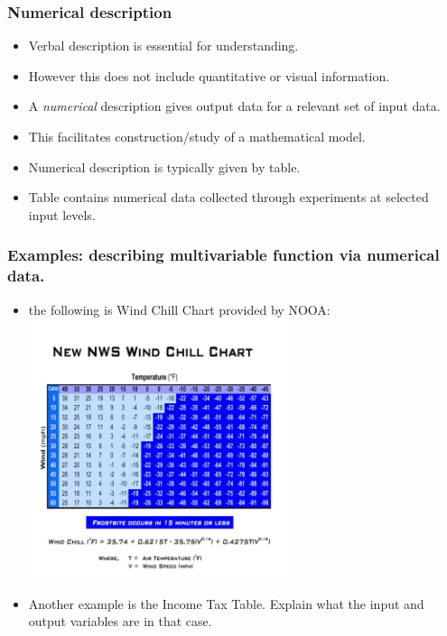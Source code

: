 \begin{frame}
\frametitle{Numerical description}
\begin{itemize}
\item Verbal description is essential for understanding.
\item However this does not include quantitative or visual information.
\item A \emph{numerical} description gives output data for a relevant set of input data.
\item This facilitates construction/study of a mathematical model.
\item Numerical description is typically given by table.
\item Table contains numerical data collected through experiments at selected input levels. 
\end{itemize}
\end{frame}

\begin{frame}
\frametitle{Examples: describing multivariable function via numerical data.}
\begin{itemize}
\item the following is Wind Chill Chart provided by NOOA:
\includegraphics[width=3in]{../../modules/multivariable-functions/pictures/windchill2.jpg}
\end{itemize}
\end{frame}
\begin{frame}
\begin{itemize}
\item Another example is the Income Tax Table. Explain what the
input and output variables are in that case.
\end{itemize}
\end{frame}
